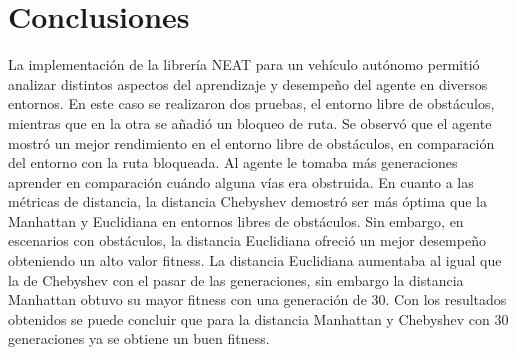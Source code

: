 \documentclass[lettersize, journal]{IEEEtran}
\begin{document}


\section{Conclusiones}
La implementación de la librería NEAT para un vehículo autónomo permitió analizar distintos aspectos del aprendizaje y desempeño del agente en diversos entornos. En este caso se realizaron dos pruebas, el entorno libre de obstáculos, mientras que en la otra se añadió un bloqueo de ruta. Se observó que el agente mostró un mejor rendimiento en el entorno libre de obstáculos, en comparación del entorno con la ruta bloqueada. Al agente le tomaba más generaciones aprender en comparación cuándo alguna vías era obstruida. En cuanto a las métricas de distancia, la distancia Chebyshev demostró ser más óptima que la Manhattan y Euclidiana en entornos libres de obstáculos. Sin embargo, en escenarios con obstáculos, la distancia Euclidiana ofreció un mejor desempeño obteniendo un alto valor fitness. La distancia Euclidiana aumentaba al igual que la de Chebyshev con el pasar de las generaciones, sin embargo la distancia Manhattan obtuvo su mayor fitness con una generación de 30. Con los resultados obtenidos se puede concluir que para la distancia Manhattan y Chebyshev con 30 generaciones ya se obtiene un buen fitness.
\end{document}
